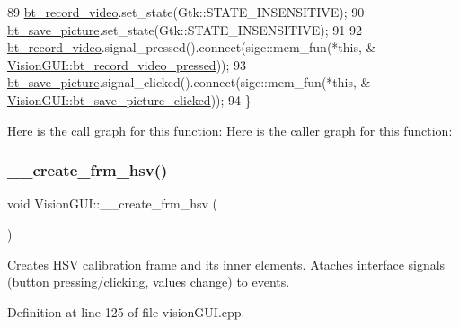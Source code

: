 \begin{DoxyCode}
89     \hyperlink{class_vision_g_u_i_a19751ae6ddc4bef7fcc0edee42820714}{bt\_record\_video}.set\_state(Gtk::STATE\_INSENSITIVE);
90     \hyperlink{class_vision_g_u_i_afe4bb4a504f404134cc5887e3c352ab4}{bt\_save\_picture}.set\_state(Gtk::STATE\_INSENSITIVE);
91 
92     \hyperlink{class_vision_g_u_i_a19751ae6ddc4bef7fcc0edee42820714}{bt\_record\_video}.signal\_pressed().connect(sigc::mem\_fun(*\textcolor{keyword}{this}, &
      \hyperlink{class_vision_g_u_i_a78a250ff8c2520a56dce79d824dbeb85}{VisionGUI::bt\_record\_video\_pressed}));
93     \hyperlink{class_vision_g_u_i_afe4bb4a504f404134cc5887e3c352ab4}{bt\_save\_picture}.signal\_clicked().connect(sigc::mem\_fun(*\textcolor{keyword}{this}, &
      \hyperlink{class_vision_g_u_i_a0f0a52b29ccd843b3e5a200d2618cd6a}{VisionGUI::bt\_save\_picture\_clicked}));
94 \}
\end{DoxyCode}
Here is the call graph for this function\+:
Here is the caller graph for this function\+:
\mbox{\label{class_vision_g_u_i_a5022537a86f97e3eb1e037044301a0f7}} 
\subsubsection{\texorpdfstring{\+\_\+\+\_\+create\+\_\+frm\+\_\+hsv()}{\_\_create\_frm\_hsv()}}
{\footnotesize\ttfamily void Vision\+G\+U\+I\+::\+\_\+\+\_\+create\+\_\+frm\+\_\+hsv (\begin{DoxyParamCaption}{ }\end{DoxyParamCaption})\hspace{0.3cm}{\ttfamily [private]}}



Creates H\+SV calibration frame and its inner elements. Ataches interface signals (button pressing/clicking, values change) to events. 



Definition at line 125 of file vision\+G\+U\+I.\+cpp.



